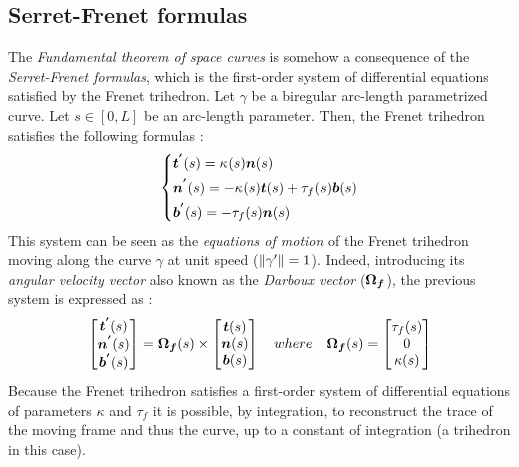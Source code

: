 \subsection{Serret-Frenet formulas}\label{sec:serret}
The \emph{Fundamental theorem of space curves} is somehow a consequence of the \emph{Serret-Frenet formulas}, which is the first-order system of differential equations satisfied by the Frenet trihedron. Let $\gamma$ be a biregular arc-length parametrized curve. Let $s \in [0,L]$ be an arc-length parameter. Then, the Frenet trihedron satisfies the following formulas :
\begin{equation}
	\left\{
	\begin{aligned}
		&\boldsymbol{t^{'}}(s) 	=  \kappa_{}(s) \boldsymbol{n}(s)\\
		&\boldsymbol{n^{'}}(s) 	=  -\kappa_{}(s) \boldsymbol{t}(s) + \tau_f(s) \boldsymbol{b}(s) \\
		&\boldsymbol{b^{'}}(s) 	=  -\tau_f(s) \boldsymbol{n}(s) \\
	\end{aligned}
	\right.
\end{equation}
This system can be seen as the \emph{equations of motion} of the Frenet trihedron moving along the curve $\gamma$ at unit speed ($\lVert\gamma'\rVert=1$). Indeed, introducing its \emph{angular velocity vector} also known as the \emph{Darboux vector} ($\boldsymbol{\Omega_f}$), the previous system is expressed as :
\begin{equation}
	\begin{bmatrix}		
		\boldsymbol{t^{'}}(s) \\
		\boldsymbol{n^{'}}(s) \\
		\boldsymbol{b^{'}}(s) \\
	\end{bmatrix}
	=
	\boldsymbol{\Omega_f}(s)
	\times
	\begin{bmatrix}		
		\boldsymbol{t}(s) \\
		\boldsymbol{n}(s) \\
		\boldsymbol{b}(s) \\
	\end{bmatrix}
	\quad where \quad
	\boldsymbol{\Omega_f}(s)
	=
	\begin{bmatrix}
		\tau_f(s) \\
		0 \\
		\kappa(s)
	\end{bmatrix}
\end{equation}
Because the Frenet trihedron satisfies a first-order system of differential equations of parameters $\kappa$ and $\tau_f$ it is possible, by integration, to reconstruct the trace of the moving frame and thus the curve, up to a constant of integration (a trihedron in this case).

